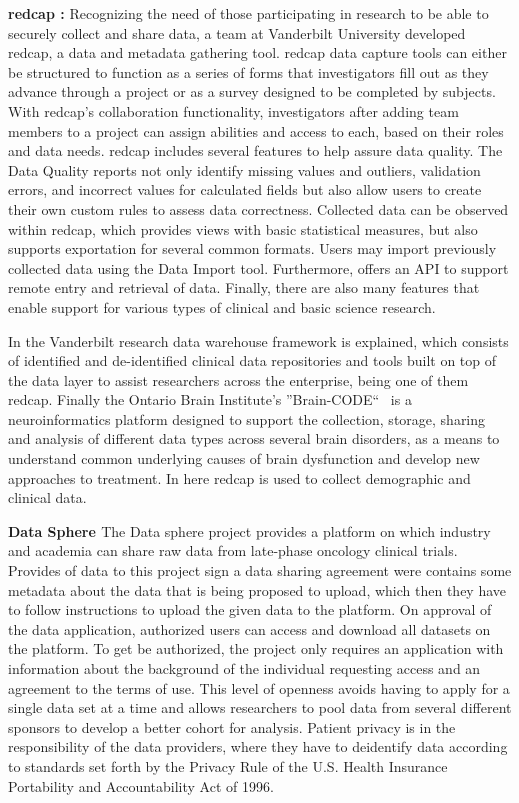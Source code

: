 \textbf{\gls{redcap} \cite{redcap}:}
Recognizing the need of those participating in research to be able to securely collect
and share data, a team at Vanderbilt University developed \gls{redcap}, a data and
metadata gathering tool.
\gls{redcap} data capture tools can either be structured to function as a series of
forms that investigators fill out as they advance through a project or as a survey
designed to be completed by subjects.
With \gls{redcap}'s collaboration functionality, investigators after adding team
members to a project can assign abilities and access to each, based on their roles and
data needs.
\gls{redcap} includes several features to help assure data quality.
The Data Quality reports not only identify missing values and outliers, validation
errors, and incorrect values for calculated fields but also allow users to create their
own custom rules to assess data correctness.
Collected data can be observed within \gls{redcap}, which provides views with basic
statistical measures, but also supports exportation for several common formats.
Users may import previously collected data using the Data Import tool.
Furthermore, offers an API to support remote entry and retrieval of data.
Finally, there are also many features that enable support for various types of clinical and
basic science research.

In \cite{vanderbilt} the Vanderbilt research data warehouse framework is explained,
which consists of identified and de-identified clinical data repositories and tools
built on top of the data layer to assist researchers across the enterprise, being one
of them \gls{redcap}.
Finally the Ontario Brain Institute’s ''Brain-CODE``~\cite{braincode} is a
neuroinformatics platform designed to support the collection, storage, sharing and
analysis of different data types across several brain disorders, as a means to
understand common underlying causes of brain dysfunction and develop new approaches to
treatment.
In here \gls{redcap} is used to collect demographic and clinical data.

\textbf{Data Sphere \cite{datasphere}}
The Data sphere project provides a platform on which industry and academia can share
raw data from late-phase oncology clinical trials.
Provides of data to this project sign a data sharing agreement were contains some
metadata about the data that is being proposed to upload, which then they have to
follow instructions to upload the given data to the platform.
On approval of the data application, authorized users can access and download all
datasets on the platform.
To get be authorized, the project only requires an application with information about
the background of the individual requesting access and an agreement to the terms of
use.
This level of openness avoids having to apply for a single data set at a time and
allows researchers to pool data from several different sponsors to develop a better
cohort for analysis.
Patient privacy is in the responsibility of the data providers, where they have to
deidentify data according to standards set forth by the Privacy Rule of the U.S. Health
Insurance Portability and Accountability Act of 1996.

